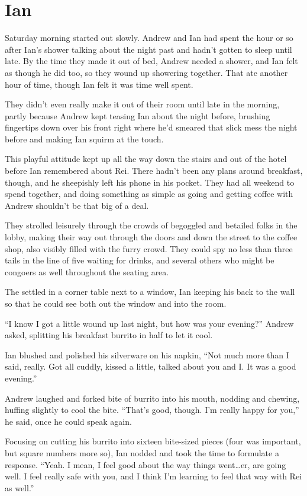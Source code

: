 \chapter{Ian}

Saturday morning started out slowly. Andrew and Ian had spent the hour or so after Ian's shower talking about the night past and hadn't gotten to sleep until late. By the time they made it out of bed, Andrew needed a shower, and Ian felt as though he did too, so they wound up showering together. That ate another hour of time, though Ian felt it was time well spent.

They didn't even really make it out of their room until late in the morning, partly because Andrew kept teasing Ian about the night before, brushing fingertips down over his front right where he'd smeared that slick mess the night before and making Ian squirm at the touch.

This playful attitude kept up all the way down the stairs and out of the hotel before Ian remembered about Rei. There hadn't been any plans around breakfast, though, and he sheepishly left his phone in his pocket. They had all weekend to spend together, and doing something as simple as going and getting coffee with Andrew shouldn't be that big of a deal.

They strolled leisurely through the crowds of begoggled and betailed folks in the lobby, making their way out through the doors and down the street to the coffee shop, also visibly filled with the furry crowd. They could spy no less than three tails in the line of five waiting for drinks, and several others who might be congoers as well throughout the seating area.

The settled in a corner table next to a window, Ian keeping his back to the wall so that he could see both out the window and into the room.

``I know I got a little wound up last night, but how was your evening?'' Andrew asked, splitting his breakfast burrito in half to let it cool.

Ian blushed and polished his silverware on his napkin, ``Not much more than I said, really. Got all cuddly, kissed a little, talked about you and I. It was a good evening.''

Andrew laughed and forked bite of burrito into his mouth, nodding and chewing, huffing slightly to cool the bite. ``That's good, though. I'm really happy for you,'' he said, once he could speak again.

Focusing on cutting his burrito into sixteen bite-sized pieces (four was important, but square numbers more so), Ian nodded and took the time to formulate a response. ``Yeah. I mean, I feel good about the way things went\ldots{}er, are going well. I feel really safe with you, and I think I'm learning to feel that way with Rei as well.''

